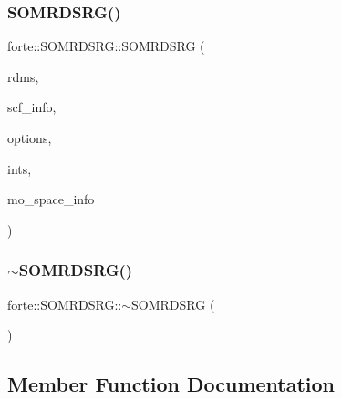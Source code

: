 \subsubsection{\texorpdfstring{S\+O\+M\+R\+D\+S\+R\+G()}{SOMRDSRG()}}
{\footnotesize\ttfamily forte\+::\+S\+O\+M\+R\+D\+S\+R\+G\+::\+S\+O\+M\+R\+D\+S\+RG (\begin{DoxyParamCaption}\item[{\mbox{\hyperlink{classforte_1_1_r_d_ms}{R\+D\+Ms}}}]{rdms,  }\item[{std\+::shared\+\_\+ptr$<$ \mbox{\hyperlink{classforte_1_1_s_c_f_info}{S\+C\+F\+Info}} $>$}]{scf\+\_\+info,  }\item[{std\+::shared\+\_\+ptr$<$ \mbox{\hyperlink{classforte_1_1_forte_options}{Forte\+Options}} $>$}]{options,  }\item[{std\+::shared\+\_\+ptr$<$ \mbox{\hyperlink{classforte_1_1_forte_integrals}{Forte\+Integrals}} $>$}]{ints,  }\item[{std\+::shared\+\_\+ptr$<$ \mbox{\hyperlink{classforte_1_1_m_o_space_info}{M\+O\+Space\+Info}} $>$}]{mo\+\_\+space\+\_\+info }\end{DoxyParamCaption})}

\mbox{\label{classforte_1_1_s_o_m_r_d_s_r_g_ac307cf14272218d040400c6df5c948ad}} 
\subsubsection{\texorpdfstring{$\sim$\+S\+O\+M\+R\+D\+S\+R\+G()}{~SOMRDSRG()}}
{\footnotesize\ttfamily forte\+::\+S\+O\+M\+R\+D\+S\+R\+G\+::$\sim$\+S\+O\+M\+R\+D\+S\+RG (\begin{DoxyParamCaption}{ }\end{DoxyParamCaption})}



\subsection{Member Function Documentation}
\mbox{\label{classforte_1_1_s_o_m_r_d_s_r_g_a436d33651a3da48db4f49df1d5bc0be3}} 
